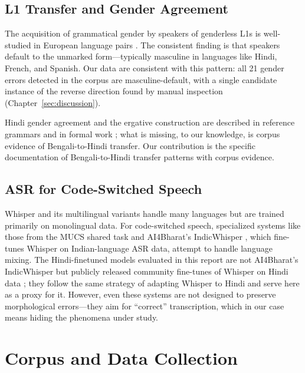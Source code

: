 \documentclass[11pt,a4paper]{report}
\begin{document}
\section{L1 Transfer and Gender Agreement}

The acquisition of grammatical gender by speakers of genderless L1s is well-studied in European language pairs \citep{sabourin2006transfer, gruter2008article}. The consistent finding is that speakers default to the unmarked form---typically masculine in languages like Hindi, French, and Spanish. Our data are consistent with this pattern: all 21 gender errors detected in the corpus are masculine-default, with a single candidate instance of the reverse direction found by manual inspection (Chapter~\ref{sec:discussion}).

Hindi gender agreement and the ergative construction are described in reference grammars \citep{kachru2006hindi} and in formal work \citep{butt1995structure}; what is missing, to our knowledge, is corpus evidence of Bengali-to-Hindi transfer. Our contribution is the specific documentation of Bengali-to-Hindi transfer patterns with corpus evidence.

\section{ASR for Code-Switched Speech}

Whisper \citep{radford2023robust} and its multilingual variants handle many languages but are trained primarily on monolingual data. For code-switched speech, specialized systems like those from the MUCS shared task \citep{diwan2021multilingual} and AI4Bharat's IndicWhisper \citep{bhogale2023vistaar}, which fine-tunes Whisper on Indian-language ASR data, attempt to handle language mixing. The Hindi-finetuned models evaluated in this report are not AI4Bharat's IndicWhisper but publicly released community fine-tunes of Whisper on Hindi data \citep{vasista22hindi}; they follow the same strategy of adapting Whisper to Hindi and serve here as a proxy for it. However, even these systems are not designed to preserve morphological errors---they aim for ``correct'' transcription, which in our case means hiding the phenomena under study.

\chapter{Corpus and Data Collection}
\label{sec:corpus}
\end{document}
